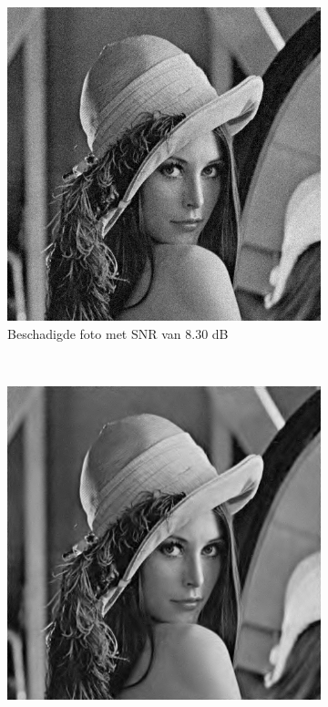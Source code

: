 \begin{figure}
    \centering
    \begin{subfigure}[b]{0.45\textwidth}
        \includegraphics[width=\textwidth]{../src/denoising/redundant/redundant_noise}
        \caption{Beschadigde foto met SNR van 8.30 dB }
        \label{fig:redundant_noise}
    \end{subfigure}
    ~ %
    \begin{subfigure}[b]{0.45\textwidth}
        \includegraphics[width=\textwidth]{../src/denoising/redundant/redundant_fixed}

\end{subfigure}
\end{figure}
